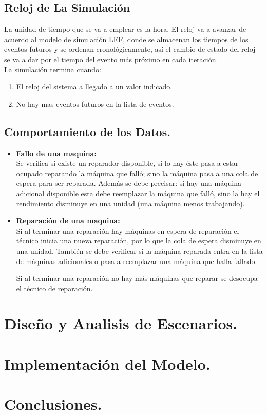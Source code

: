 \documentclass[10pt]{article}
\begin{document}
\subsection{Reloj de La Simulación}

La unidad de tiempo que se va a emplear es la hora. El reloj va a avanzar de acuerdo al modelo de simulación LEF, donde se almacenan los tiempos de los eventos futuros y se ordenan cronológicamente, así el cambio de estado del reloj  se va a dar por el tiempo del evento más próximo en cada iteración.\\

La simulación termina cuando:
\begin{enumerate}
\item El reloj del sistema a llegado a un valor indicado.
\item No hay mas eventos futuros en la lista de eventos.
\end{enumerate}

\subsection{Comportamiento de los Datos.}

\begin{itemize}
\item \textbf{Fallo de una maquina:}\\
Se verifica si existe un reparador disponible, si lo hay éste pasa a estar ocupado reparando la máquina que falló; sino la máquina pasa a una cola de espera para ser reparada.
Además se debe precisar: si hay una máquina adicional disponible esta debe reemplazar la máquina que falló, sino la hay el rendimiento disminuye en una unidad (una máquina menos trabajando).


\item \textbf{Reparación de una maquina:}\\
Si al terminar una reparación hay máquinas en espera de reparación el técnico inicia una nueva reparación, por lo que la cola de espera disminuye en una unidad. También se debe verificar si
la máquina reparada entra en la lista de máquinas adicionales o pasa a reemplazar una máquina que halla fallado.

Si al terminar una reparación no hay más máquinas que reparar se desocupa el técnico de reparación.

\end{itemize}



\section{Diseño y Analisis de Escenarios.}


\section{Implementación del Modelo.}




\section{Conclusiones.}
\end{document}
